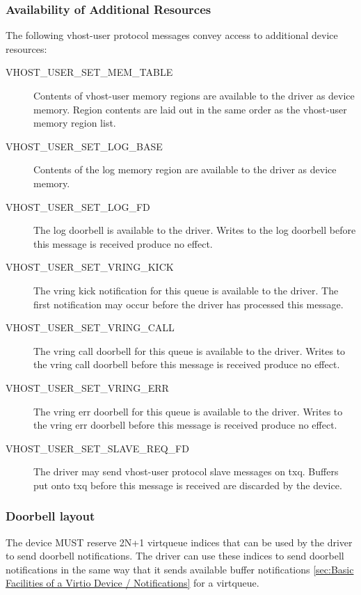 \subsubsection{Availability of Additional Resources}\label{sec:Device Types / Vhost-user Device Backend / Additional Device Resources / Availability of Additional Resources}

The following vhost-user protocol messages convey access to additional device
resources:

\begin{description}
\item[VHOST_USER_SET_MEM_TABLE] Contents of vhost-user memory regions are available to the driver as device memory. Region contents are laid out in the same order as the vhost-user memory region list.
\item[VHOST_USER_SET_LOG_BASE] Contents of the log memory region are available to the driver as device memory.
\item[VHOST_USER_SET_LOG_FD] The log doorbell is available to the driver.  Writes to the log doorbell before this message is received produce no effect.
\item[VHOST_USER_SET_VRING_KICK] The vring kick notification for this queue is available to the driver.  The first notification may occur before the driver has processed this message.
\item[VHOST_USER_SET_VRING_CALL] The vring call doorbell for this queue is available to the driver.  Writes to the vring call doorbell before this message is received produce no effect.
\item[VHOST_USER_SET_VRING_ERR] The vring err doorbell for this queue is available to the driver.  Writes to the vring err doorbell before this message is received produce no effect.
\item[VHOST_USER_SET_SLAVE_REQ_FD] The driver may send vhost-user protocol slave messages on txq.  Buffers put onto txq before this message is received are discarded by the device.
\end{description}

\subsubsection{Doorbell layout}\label{sec:Device Types / Vhost-user Device Backend / Additional Device Resources / Doorbell layout}

The device MUST reserve 2N+1 virtqueue indices that can be used by the driver to
send doorbell notifications. The driver can use these indices to send doorbell
notifications in the same way that it sends available buffer notifications
\ref{sec:Basic Facilities of a Virtio Device / Notifications} for a virtqueue.

